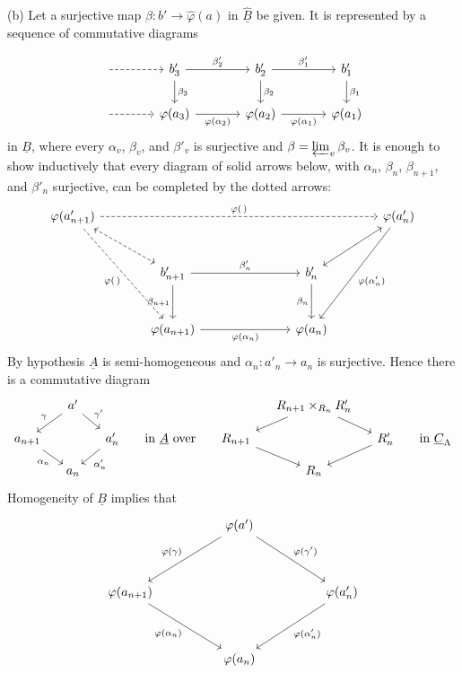 (b) Let a surjective map
$\beta:b'\longrightarrow\widehat\varphi(a)$ in
$\widehat{\underline B}$ be given. It is represented by a sequence
of commutative diagrams


\[
\begin{tikzcd}[column sep=large]
 {} \arrow[r,dashed] & b'_3 \arrow[r,"{\beta'_2}"] \arrow[d,"{\beta_3}"]
 & b'_2 \arrow[r,"{\beta'_1}"] \arrow[d,"{\beta_2}"]
 & b'_1 \arrow[d,"{\beta_1}"]\\
 {} \arrow[r,dashed] & \varphi(a_3) \arrow[r,"{\varphi(\alpha_2)}"']
 & \varphi(a_2) \arrow[r,"{\varphi(\alpha_1)}"']
 & \varphi(a_1)
\end{tikzcd}
\]
in $\underline B$, where every $\alpha_v$, $\beta_v$, and
$\beta'_v$ is surjective and
$\beta=\varprojlim_v\beta_v$. It is enough to show inductively that
every diagram of solid arrows below, with
$\alpha_n$, $\beta_n$, $\beta_{n+1}$, and $\beta'_n$ surjective,
can be completed by the dotted arrows:
\[
\begin{tikzcd}[column sep=large,row sep=large]
 \varphi(a'_{n+1})
   \arrow[rrrr,dashed,"{\varphi(\,)}"]
   \arrow[dr,dashed,leftrightarrow]
   \arrow[ddr,dashed,"{\varphi(\,)}"']
 &&&& \varphi(a'_n)
   \arrow[dl,leftrightarrow]
   \arrow[ddl,"{\varphi(\alpha'_n)}"]\\
 & b'_{n+1} \arrow[rr,"{\beta'_n}"] \arrow[d,"{\beta_{n+1}}"']
 && b'_n \arrow[d,"{\beta_n}"'] &\\
 & \varphi(a_{n+1}) \arrow[rr,"{\varphi(\alpha_n)}"']
 && \varphi(a_n) &
\end{tikzcd}
\]
By hypothesis $\underline A$ is semi-homogeneous and
$\alpha_n:a'_{n}\longrightarrow a_n$ is surjective. Hence there is
a commutative diagram
\[
\begin{tikzcd}[column sep=small,row sep=small]
 & a' \arrow[dl,"{\gamma}"'] \arrow[dr,"{\gamma'}"] &
 &&& R_{n+1}\times_{R_n}R'_n \arrow[dl] \arrow[dr] &\\
 a_{n+1} \arrow[dr,"{\alpha_n}"'] &&
 a'_n \arrow[dl,"{\alpha'_n}"]
 & \text{in $\underline A$ over} &
 R_{n+1} \arrow[dr] && R'_n \arrow[dl]
 & \text{in $\underline C_\Lambda$}\\
 & a_n &&&& R_n &&
\end{tikzcd}
\]
Homogeneity of $\underline B$ implies that
\[
\begin{tikzcd}[column sep=huge,row sep=huge]
 & \varphi(a') \arrow[dl,"{\varphi(\gamma)}"']
                  \arrow[dr,"{\varphi(\gamma')}"] &\\
 \varphi(a_{n+1}) \arrow[dr,"{\varphi(\alpha_n)}"']
 && \varphi(a'_n) \arrow[dl,"{\varphi(\alpha'_n)}"]\\
 & \varphi(a_n) &
\end{tikzcd}
\]

